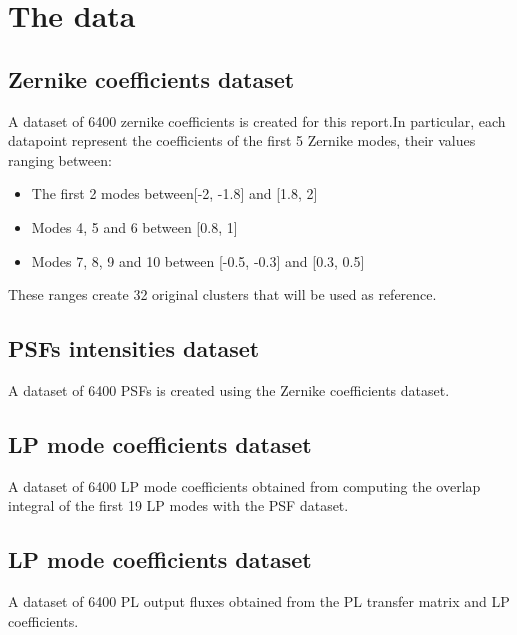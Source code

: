 \section{The data}

	\subsection{Zernike coefficients dataset}
			A dataset of 6400 zernike coefficients is created for this report.In particular, each datapoint represent the coefficients of the first 5 Zernike modes, their values ranging between:
			\begin{itemize}
				\item The first 2 modes between[-2, -1.8] and [1.8, 2]
				\item Modes 4, 5 and 6 between [0.8, 1]
				\item Modes 7, 8, 9 and 10 between [-0.5, -0.3] and [0.3, 0.5]
			\end{itemize}			 
			These ranges create 32 original clusters that will be used as reference.
			
	\subsection{PSFs intensities dataset}
		A dataset of 6400 PSFs is created using the Zernike coefficients dataset.
		
	\subsection{LP mode coefficients dataset}
		A dataset of 6400 LP mode coefficients obtained from computing the overlap integral of the first 19 LP modes with the PSF dataset.
		
	\subsection{LP mode coefficients dataset}
		A dataset of 6400 PL output fluxes obtained from the PL transfer matrix and LP coefficients.
		